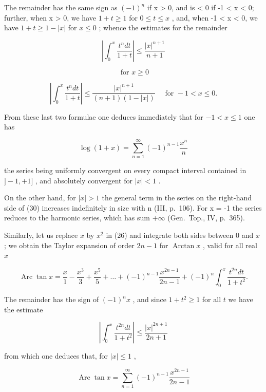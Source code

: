 The remainder has the same sign as \((-1)^{n}\) if x \textgreater{} 0, and is \textless{} 0 if -1 \textless{} x \textless{} 0; further, when x \textgreater{} 0, we have \(1 + t \geqslant 1\) for \(0 \leqslant t \leqslant x\) , and, when -1 \textless{} x \textless{} 0, we have \(1 + t \geqslant 1 - |x|\) for \(x \leqslant 0\) ; whence the estimates for the remainder

\[
\left| \int_ {0} ^ {x} \frac {t ^ {n} d t}{1 + t} \right| \leqslant \frac {| x | ^ {n + 1}}{n + 1}
\]

\[
\text { for } x \geqslant 0\tag{28}
\]

\[
\left| \int_ {0} ^ {x} \frac {t ^ {n} d t}{1 + t} \right| \leqslant \frac {| x | ^ {n + 1}}{(n + 1) (1 - | x |)} \quad \text {   for   } - 1 <   x \leqslant 0.\tag{29}
\]

From these last two formulae one deduces immediately that for \(-1 < x \leqslant 1\) one has

\[
\log (1 + x) = \sum_ {n = 1} ^ {\infty} (- 1) ^ {n - 1} \frac {x ^ {n}}{n}\tag{30}
\]

the series being uniformly convergent on every compact interval contained in \(]-1,+1]\) , and absolutely convergent for \(|x|<1\) .

On the other hand, for \(|x| > 1\) the general term in the series on the right-hand side of (30) increases indefinitely in size with n (III, p.~106). For x = -1 the series reduces to the harmonic series, which has sum \(+\infty\) (Gen.~Top., IV, p.~365).

Similarly, let us replace \(x\) by \(x^2\) in (26) and integrate both sides between 0 and \(x\) ; we obtain the Taylor expansion of order \(2n - 1\) for \(\operatorname{Arctan} x\) , valid for all real \(x\)

\[
\operatorname{Arc} \tan x = \frac {x}{1} - \frac {x ^ {3}}{3} + \frac {x ^ {5}}{5} + \dots + (- 1) ^ {n - 1} \frac {x ^ {2 n - 1}}{2 n - 1} + (- 1) ^ {n} \int_ {0} ^ {x} \frac {t ^ {2 n} d t}{1 + t ^ {2}}.\tag{31}
\]

The remainder has the sign of \((-1)^n x\) , and since \(1 + t^2 \geqslant 1\) for all \(t\) we have the estimate

\[
\left| \int_ {0} ^ {x} \frac {t ^ {2 n} d t}{1 + t ^ {2}} \right| \leqslant \frac {| x | ^ {2 n + 1}}{2 n + 1}\tag{32}
\]

from which one deduces that, for \(|x| \leqslant 1\) ,

\[
\operatorname{Arc} \tan x = \sum_ {n = 1} ^ {\infty} (- 1) ^ {n - 1} \frac {x ^ {2 n - 1}}{2 n - 1}\tag{33}
\]

